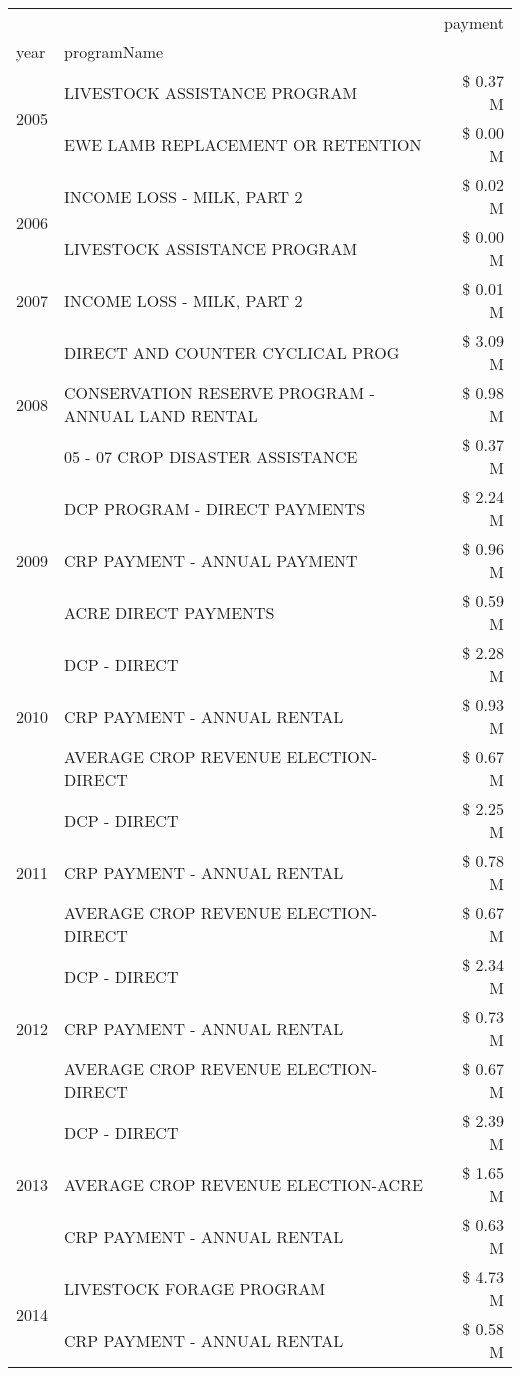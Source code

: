 \begin{tabular}{llr}
\toprule
 &  & payment \\
year & programName &  \\
\midrule
\multirow[t]{2}{*}{2005} & LIVESTOCK ASSISTANCE PROGRAM & \$ 0.37 M \\
 & EWE LAMB REPLACEMENT OR RETENTION & \$ 0.00 M \\
\cline{1-3}
\multirow[t]{2}{*}{2006} & INCOME LOSS - MILK, PART 2 & \$ 0.02 M \\
 & LIVESTOCK ASSISTANCE PROGRAM & \$ 0.00 M \\
\cline{1-3}
2007 & INCOME LOSS - MILK, PART 2 & \$ 0.01 M \\
\cline{1-3}
\multirow[t]{3}{*}{2008} & DIRECT AND COUNTER CYCLICAL PROG & \$ 3.09 M \\
 & CONSERVATION RESERVE PROGRAM - ANNUAL LAND RENTAL & \$ 0.98 M \\
 & 05 - 07 CROP DISASTER ASSISTANCE & \$ 0.37 M \\
\cline{1-3}
\multirow[t]{3}{*}{2009} & DCP PROGRAM - DIRECT PAYMENTS & \$ 2.24 M \\
 & CRP PAYMENT - ANNUAL PAYMENT & \$ 0.96 M \\
 & ACRE DIRECT PAYMENTS & \$ 0.59 M \\
\cline{1-3}
\multirow[t]{3}{*}{2010} & DCP - DIRECT & \$ 2.28 M \\
 & CRP PAYMENT - ANNUAL RENTAL & \$ 0.93 M \\
 & AVERAGE CROP REVENUE ELECTION-DIRECT & \$ 0.67 M \\
\cline{1-3}
\multirow[t]{3}{*}{2011} & DCP - DIRECT & \$ 2.25 M \\
 & CRP PAYMENT - ANNUAL RENTAL & \$ 0.78 M \\
 & AVERAGE CROP REVENUE ELECTION-DIRECT & \$ 0.67 M \\
\cline{1-3}
\multirow[t]{3}{*}{2012} & DCP - DIRECT & \$ 2.34 M \\
 & CRP PAYMENT - ANNUAL RENTAL & \$ 0.73 M \\
 & AVERAGE CROP REVENUE ELECTION-DIRECT & \$ 0.67 M \\
\cline{1-3}
\multirow[t]{3}{*}{2013} & DCP - DIRECT & \$ 2.39 M \\
 & AVERAGE CROP REVENUE ELECTION-ACRE & \$ 1.65 M \\
 & CRP PAYMENT - ANNUAL RENTAL & \$ 0.63 M \\
\cline{1-3}
\multirow[t]{3}{*}{2014} & LIVESTOCK FORAGE PROGRAM & \$ 4.73 M \\
 & CRP PAYMENT - ANNUAL RENTAL & \$ 0.58 M \\

\end{tabular}

